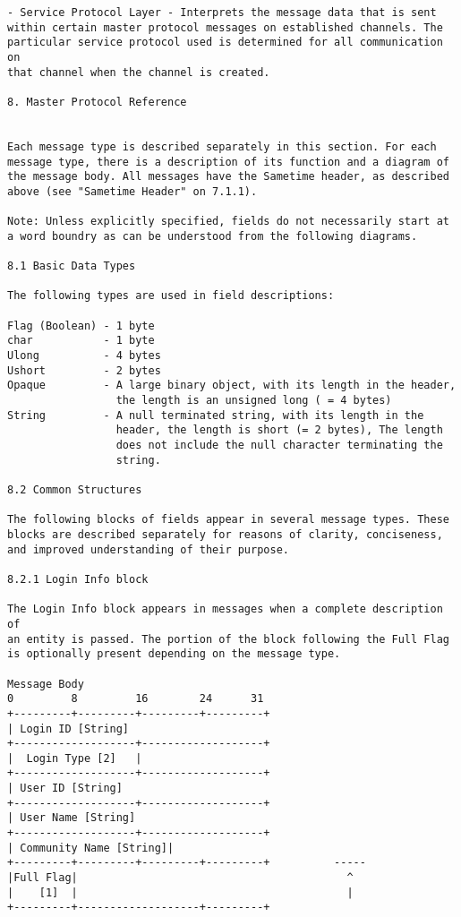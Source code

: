 \documentclass[titlepage,oneside]{book}
\begin{document}
\begin{verbatim}
- Service Protocol Layer - Interprets the message data that is sent
within certain master protocol messages on established channels. The
particular service protocol used is determined for all communication on
that channel when the channel is created.

8. Master Protocol Reference


Each message type is described separately in this section. For each
message type, there is a description of its function and a diagram of
the message body. All messages have the Sametime header, as described
above (see "Sametime Header" on 7.1.1).

Note: Unless explicitly specified, fields do not necessarily start at
a word boundry as can be understood from the following diagrams.

8.1 Basic Data Types

The following types are used in field descriptions:

Flag (Boolean) - 1 byte
char           - 1 byte
Ulong          - 4 bytes
Ushort         - 2 bytes
Opaque         - A large binary object, with its length in the header,
                 the length is an unsigned long ( = 4 bytes)
String         - A null terminated string, with its length in the
                 header, the length is short (= 2 bytes), The length
                 does not include the null character terminating the
                 string.

8.2 Common Structures

The following blocks of fields appear in several message types. These
blocks are described separately for reasons of clarity, conciseness,
and improved understanding of their purpose.

8.2.1 Login Info block

The Login Info block appears in messages when a complete description of
an entity is passed. The portion of the block following the Full Flag
is optionally present depending on the message type.

Message Body
0         8         16        24      31
+---------+---------+---------+---------+
| Login ID [String]
+-------------------+-------------------+
|  Login Type [2]   |
+-------------------+-------------------+
| User ID [String]
+-------------------+-------------------+
| User Name [String]
+-------------------+-------------------+
| Community Name [String]|
+---------+---------+---------+---------+          -----
|Full Flag|                                          ^
|    [1]  |                                          |
+---------+-------------------+---------+


\end{verbatim}
\end{document}
